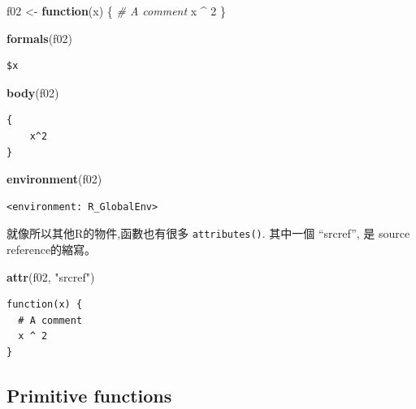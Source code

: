 \documentclass[]{book}
\newenvironment{Shaded}{\begin{snugshade}}{\end{snugshade}}
\newcommand{\CommentTok}[1]{\textcolor[rgb]{0.56,0.35,0.01}{\textit{#1}}}
\newcommand{\ControlFlowTok}[1]{\textcolor[rgb]{0.13,0.29,0.53}{\textbf{#1}}}
\newcommand{\DecValTok}[1]{\textcolor[rgb]{0.00,0.00,0.81}{#1}}
\newcommand{\KeywordTok}[1]{\textcolor[rgb]{0.13,0.29,0.53}{\textbf{#1}}}
\newcommand{\NormalTok}[1]{#1}
\newcommand{\OperatorTok}[1]{\textcolor[rgb]{0.81,0.36,0.00}{\textbf{#1}}}
\newcommand{\StringTok}[1]{\textcolor[rgb]{0.31,0.60,0.02}{#1}}
\theoremstyle{definition}
\theoremstyle{definition}
\theoremstyle{definition}
\theoremstyle{remark}
\begin{document}
\begin{Shaded}
\begin{Highlighting}[]
\NormalTok{f02 <-}\StringTok{ }\ControlFlowTok{function}\NormalTok{(x) \{}
  \CommentTok{# A comment}
\NormalTok{  x }\OperatorTok{^}\StringTok{ }\DecValTok{2}
\NormalTok{\}}

\KeywordTok{formals}\NormalTok{(f02)}
\end{Highlighting}
\end{Shaded}

\begin{verbatim}
$x
\end{verbatim}

\begin{Shaded}
\begin{Highlighting}[]
\KeywordTok{body}\NormalTok{(f02)}
\end{Highlighting}
\end{Shaded}

\begin{verbatim}
{
    x^2
}
\end{verbatim}

\begin{Shaded}
\begin{Highlighting}[]
\KeywordTok{environment}\NormalTok{(f02)}
\end{Highlighting}
\end{Shaded}

\begin{verbatim}
<environment: R_GlobalEnv>
\end{verbatim}

就像所以其他R的物件,函數也有很多 \texttt{attributes()}. 其中一個
``srcref'', 是 source reference的縮寫。 　

\begin{Shaded}
\begin{Highlighting}[]
\KeywordTok{attr}\NormalTok{(f02, }\StringTok{"srcref"}\NormalTok{)}
\end{Highlighting}
\end{Shaded}

\begin{verbatim}
function(x) {
  # A comment
  x ^ 2
}
\end{verbatim}

\hypertarget{primitive-functions}{%
\subsection{Primitive functions}\label{primitive-functions}}
\end{document}
